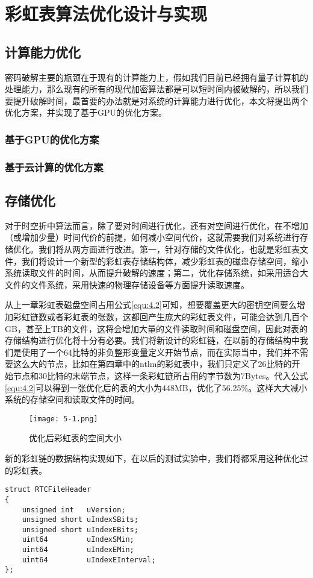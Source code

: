 \chapter{彩虹表算法优化设计与实现}
\section{计算能力优化}
密码破解主要的瓶颈在于现有的计算能力上，假如我们目前已经拥有量子计算机的处理能力，那么现有的所有的现代加密算法都是可以短时间内被破解的，所以我们要提升破解时间，最首要的办法就是对系统的计算能力进行优化，本文将提出两个优化方案，并实现了基于GPU的优化方案。
	\subsection{基于GPU的优化方案}
	\subsection{基于云计算的优化方案}
\section{存储优化}
对于时空折中算法而言，除了要对时间进行优化，还有对空间进行优化，在不增加（或增加少量）时间代价的前提，如何减小空间代价，这就需要我们对系统进行存储优化。我们将从两方面进行改进。第一，针对存储的文件优化，也就是彩虹表文件，我们将设计一个新型的彩虹表存储结构体，减少彩虹表的磁盘存储空间，缩小系统读取文件的时间，从而提升破解的速度；第二，优化存储系统，如采用适合大文件的文件系统，采用快速的物理存储设备等方面提升读取速度。

从上一章彩虹表磁盘空间占用公式\eqref{equ:4.2}可知，想要覆盖更大的密钥空间要么增加彩虹链数或者彩虹表的张数，这都回产生庞大的彩虹表文件，可能会达到几百个GB，甚至上TB的文件，这将会增加大量的文件读取时间和磁盘空间，因此对表的存储结构进行优化将十分有必要。我们将新设计的彩虹链，在以前的存储结构中我们是使用了一个64比特的非负整形变量定义开始节点，而在实际当中，我们并不需要这么大的节点，比如在第四章中的ntlm的彩虹表中，我们只定义了26比特的开始节点和30比特的末端节点，这样一条彩虹链所占用的字节数为7Bytes。代入公式\eqref{equ:4.2}可以得到一张优化后的表的大小为448MB，优化了56.25\%。这样大大减小系统的存储空间和读取文件的时间。
\begin{figure}[!ht]
\centering
\texttt{[image: 5-1.png]}
\caption{优化后彩虹表的空间大小}
\label{fig:5.1}
\end{figure}

新的彩虹链的数据结构实现如下，在以后的测试实验中，我们将都采用这种优化过的彩虹表。
\begin{lstlisting}
struct RTCFileHeader
{
    unsigned int   uVersion;    
    unsigned short uIndexSBits; 
    unsigned short uIndexEBits; 
    uint64         uIndexSMin;
    uint64         uIndexEMin;
    uint64         uIndexEInterval;
};
\end{lstlisting}

